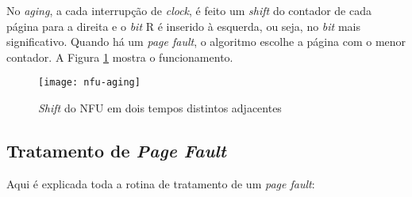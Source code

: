 No \textit{aging}, a cada interrupção de \textit{clock}, é feito um \textit{shift} do contador de cada página para a direita e o \textit{bit} R é inserido à esquerda, ou seja, no \textit{bit} mais significativo. Quando há um \textit{page fault}, o algoritmo escolhe a página com o menor contador. A Figura \ref{fig:nfu-aging} mostra o funcionamento.

\begin{figure}[h]
  \centering
  \texttt{[image: nfu-aging]}
  \caption{\textit{Shift} do NFU em dois tempos distintos adjacentes}
  \label{fig:nfu-aging}
\end{figure}




\subsection{Tratamento de \textit{Page Fault}}
Aqui é explicada toda a rotina de tratamento de um \textit{page fault}:

